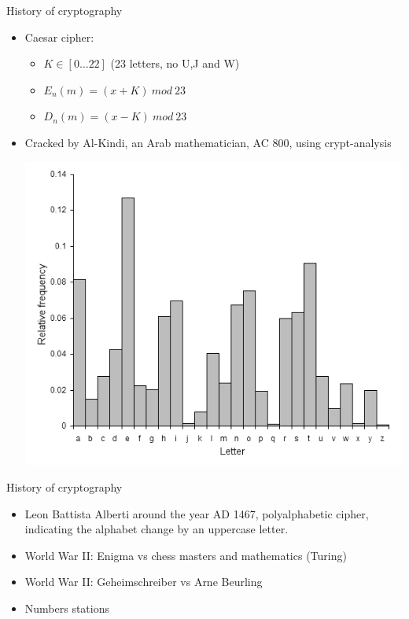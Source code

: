 \documentclass{beamer}
\begin{document}
\begin{frame}{History of cryptography}
  \begin{itemize}
  \item Caesar cipher:
  \begin{itemize}
  \item $K \in [0 \dots 22]$ (23 letters, no U,J and W)
  \item $E_n(m) = (x+K) \ mod\  23$
  \item $D_n(m) = (x-K) \ mod\  23$
  \end{itemize}
\item<2-> Cracked by Al-Kindi, an Arab mathematician, AC 800, using
  crypt-analysis \\
  \begin{center}
    \includegraphics[width=0.4\linewidth]{analysis}
  \end{center}
  \end{itemize}
  
\end{frame}

\begin{frame}{History of cryptography}
  \begin{itemize}
  \item  Leon Battista Alberti around the year AD 1467,
    polyalphabetic cipher, indicating the alphabet change by an
    uppercase letter.
  \item World War II: Enigma vs chess masters and mathematics (Turing)
  \item World War II: Geheimschreiber vs Arne Beurling
  \item Numbers stations
  \end{itemize}
\end{frame}
\end{document}
